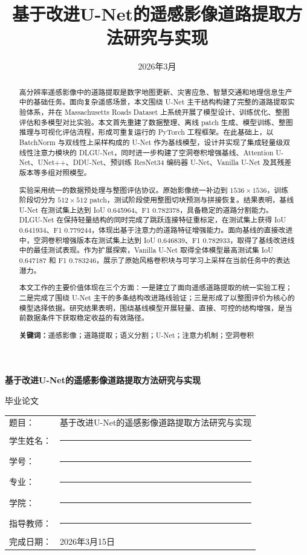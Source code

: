 \documentclass[12pt,a4paper]{ctexart}
\title{基于改进U-Net的遥感影像道路提取方法研究与实现}
\author{}
\date{2026年3月}
\begin{document}
\begin{titlepage}
\centering
\vspace*{2cm}
{\bfseries 基于改进U-Net的遥感影像道路提取方法研究与实现\par}
\vspace{2cm}
{毕业论文\par}
\vspace{2.5cm}
\begin{tabular}{p{4cm}p{8cm}}
题目： & 基于改进U-Net的遥感影像道路提取方法研究与实现 \\
学生姓名： & \rule{7cm}{0.4pt} \\
学号： & \rule{7cm}{0.4pt} \\
专业： & \rule{7cm}{0.4pt} \\
学院： & \rule{7cm}{0.4pt} \\
指导教师： & \rule{7cm}{0.4pt} \\
完成日期： & 2026年3月15日 \\
\end{tabular}
\vfill
\end{titlepage}


\begin{abstract}
高分辨率遥感影像中的道路提取是数字地图更新、灾害应急、智慧交通和地理信息生产中的基础任务。面向复杂遥感场景，本文围绕 U-Net 主干结构构建了完整的道路提取实验体系，并在 Massachusetts Roads Dataset 上系统开展了模型设计、训练优化、整图评估和多模型对比实验。本文首先重建了数据整理、离线 patch 生成、模型训练、整图推理与可视化评估流程，形成可重复运行的 PyTorch 工程框架。在此基础上，以 BatchNorm 与双线性上采样构成的 U-Net 作为基线模型，设计并实现了集成轻量级双线性注意力模块的 DLGU-Net，同时进一步构建了空洞卷积增强基线、Attention U-Net、UNet++、DDU-Net、预训练 ResNet34 编码器 U-Net、Vanilla U-Net 及其残差版本等多组对照模型。

实验采用统一的数据预处理与整图评估协议。原始影像统一补边到 $1536 \times 1536$，训练阶段切分为 $512 \times 512$ patch，测试阶段使用整图切块预测与拼接恢复。结果表明，基线 U-Net 在测试集上达到 IoU 0.645964、F1 0.782378，具备稳定的道路分割能力。DLGU-Net 在保持轻量结构的同时完成了跳跃连接特征重标定，在测试集上获得 IoU 0.641934、F1 0.779244，体现出基于注意力的道路特征增强能力。面向基线的直接改进中，空洞卷积增强版本在测试集上达到 IoU 0.646839、F1 0.782933，取得了基线改进线中的最佳测试表现。作为扩展探索，Vanilla U-Net 取得全体模型最高测试集 IoU 0.647187 和 F1 0.783246，展示了原始风格卷积块与可学习上采样在当前任务中的表达潜力。

本文工作的主要价值体现在三个方面：一是建立了面向遥感道路提取的统一实验工程；二是完成了围绕 U-Net 主干的多条结构改进路线验证；三是形成了以整图评价为核心的模型选择依据。研究结果表明，围绕基线模型开展轻量、直接、可控的结构增强，是当前数据条件下获取稳定收益的有效路径。

\noindent\textbf{关键词：}遥感影像；道路提取；语义分割；U-Net；注意力机制；空洞卷积
\end{abstract}
\end{document}
